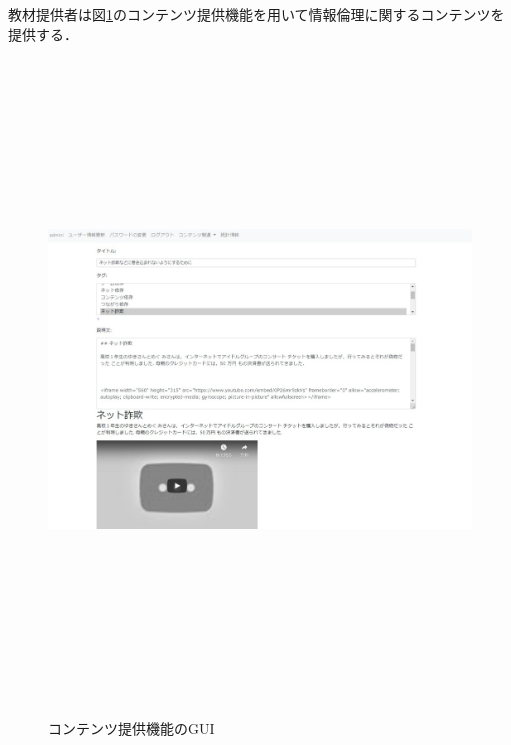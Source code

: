 \newpage
教材提供者は図\ref{teikyou}のコンテンツ提供機能を用いて情報倫理に関するコンテンツを提供する．

\begin{figure}[htbp]
    \begin{center}
        \includegraphics[width=18cm,height=17cm,keepaspectratio]{create_content-crop.pdf}\\
    \end{center}
    \caption{コンテンツ提供機能のGUI}
    \label{teikyou}
\end{figure}

